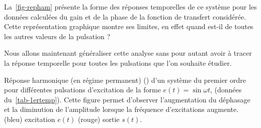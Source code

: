 La~\cref{fig-repham} présente la forme des réponses temporelles de ce système 
pour les données calculées du gain et de la phase de la fonction de transfert 
considérée. Cette représentation graphique montre ses limites, en effet quand
est-il de toutes les autres valeurs de la pulsation ? 

Nous allons maintenant généraliser cette analyse sans pour autant avoir à 
tracer la réponse temporelle pour toutes les pulsations que l'on souhaite 
étudier.
\begin{marginfigure}[-20em]
    \centering
    \resizebox{\linewidth}{!}{}
    \resizebox{\linewidth}{!}{}
    \resizebox{\linewidth}{!}{}
    \caption{Réponse harmonique (en régime permanent) () d'un 
             système du premier ordre pour différentes pulsations d'excitation 
             de la forme $e(t)=\sin{\omega t}$, (données du~\cref{tab-1ertemp}).
             Cette figure permet d'observer l'augmentation du déphasage et la 
             diminution de l'amplitude lorsque la fréquence d'excitations 
             augmente. (bleu) excitation $e(t)$ (rouge) sortie $s(t)$.
             \label{fig-repham}}
\end{marginfigure}
\newpage
